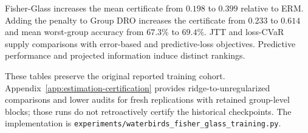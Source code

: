 Fisher-Glass increases the mean certificate from $0.198$ to $0.399$ relative to ERM. Adding the penalty to Group DRO increases the certificate from $0.233$ to $0.614$ and mean worst-group accuracy from $67.3\%$ to $69.4\%$. JTT and loss-CVaR supply comparisons with error-based and predictive-loss objectives. Predictive performance and projected information induce distinct rankings.

These tables preserve the original reported training cohort. Appendix~\ref{app:estimation-certification} provides ridge-to-unregularized comparisons and lower audits for fresh replications with retained group-level blocks; those runs do not retroactively certify the historical checkpoints. The implementation is \texttt{experiments/waterbirds\_fisher\_glass\_training.py}.
\FloatBarrier
